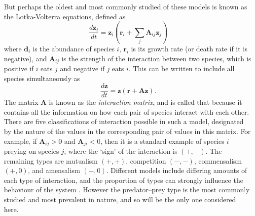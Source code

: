 But perhaps the oldest and most commonly studied of these models is known as the Lotka-Volterra equations, defined as
\begin{equation}
  \frac{d\mathbf{z}_i}{dt} = \mathbf{z}_i(\mathbf{r}_i + \sum_j\mathbf{A}_{ij}\mathbf{z}_j)
  \label{eq:lotka_volterra}
\end{equation}
where $\mathbf{d}_i$ is the abundance of species $i$, $\mathbf{r}_i$ is its growth rate (or death rate if it is negative), and $\mathbf{A}_{ij}$ is the strength of the interaction between two species, which is positive if $i$ eats $j$ and negative if $j$ eats $i$. 
This can be written to include all species simultaneously as
\begin{equation}
    \frac{d\mathbf{z}}{dt} = \mathbf{z}(\mathbf{r} + \mathbf{Az}).
    \label{eq:interaction_matrix}
\end{equation}
The matrix $\mathbf{A}$ is known as the \emph{interaction matrix}, and is called that because it contains all the information on how each pair of species interact with each other.
There are five classifications of interaction possible in such a model, designated by the nature of the values in the corresponding pair of values in this matrix. For example, if $\mathbf{A}_{ij}>0$ and $\mathbf{A}_{ji}<0$, then it is a standard example of species $i$ preying on species $j$, where the `sign' of the interaction is $(+,-)$. The remaining types are mutualism $(+,+)$, competition $(-,-)$, commensalism $(+,0)$, and amensalism $(-,0)$.
Different models include differing amounts of each type of interaction, and the proportion of types can strongly influence the behaviour of the system \cite{Tang2014Correlation}. However the predator--prey type is the most commonly studied and most prevalent in nature, and so will be the only one considered here.

